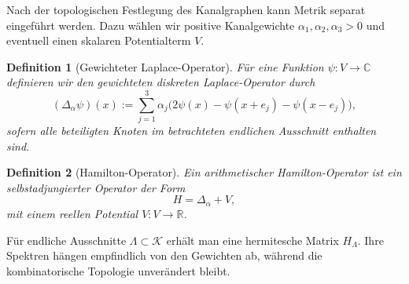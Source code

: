 \documentclass[11pt,a4paper]{article}
\newtheorem{definition}{Definition}[section]
\theoremstyle{remark}
\newcommand{\R}{\mathbb{R}}
\newcommand{\C}{\mathbb{C}}
\newcommand{\K}{\mathcal{K}}
\begin{document}
	Nach der topologischen Festlegung des Kanalgraphen kann Metrik separat eingeführt werden. Dazu wählen wir positive Kanalgewichte $\alpha_1,\alpha_2,\alpha_3>0$ und eventuell einen skalaren Potentialterm $V$.
	
	\begin{definition}[Gewichteter Laplace-Operator]
		Für eine Funktion $\psi:V\to\C$ definieren wir den gewichteten diskreten Laplace-Operator durch
		\begin{equation}
			(\Delta_{\alpha}\psi)(x)
			:=\sum_{j=1}^3 \alpha_j\bigl(2\psi(x)-\psi(x+e_j)-\psi(x-e_j)\bigr),
		\end{equation}
		sofern alle beteiligten Knoten im betrachteten endlichen Ausschnitt enthalten sind.
	\end{definition}
	
	\begin{definition}[Hamilton-Operator]
		Ein arithmetischer Hamilton-Operator ist ein selbstadjungierter Operator der Form
		\begin{equation}
			H = \Delta_{\alpha}+V,
		\end{equation}
		mit einem reellen Potential $V:V\to\R$.
	\end{definition}
	
	Für endliche Ausschnitte $\Lambda\subset\K$ erhält man eine hermitesche Matrix $H_\Lambda$. Ihre Spektren hängen empfindlich von den Gewichten ab, während die kombinatorische Topologie unverändert bleibt.
	
\end{document}
